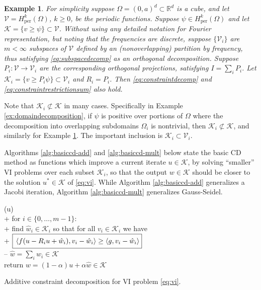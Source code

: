 \documentclass[letterpaper,final,12pt,reqno]{amsart}
\theoremstyle{cstyle}
\theoremstyle{cstyle*}
\theoremstyle{dstyle}
\newtheorem{example}[theorem]{Example}
\numberwithin{equation}{section}
\numberwithin{figure}{section}
\numberwithin{table}{section}
\numberwithin{theorem}{section}
\newcommand{\RR}{\mathbb{R}}
\newcommand{\cK}{\mathcal{K}}
\newcommand{\cV}{\mathcal{V}}
\newcommand{\ip}[2]{\left<#1,#2\right>}
\begin{document}
\begin{example}  \label{ex:frequencydecomposition}  For simplicity suppose $\Omega = (0,a)^d \subset \RR^d$ is a cube, and let $\cV = H_{\text{per}}^k(\Omega)$, $k\ge 0$, be the periodic functions.  Suppose $\psi \in H_{\text{per}}^k(\Omega)$ and let $\cK = \{v \ge \psi\} \subset \cV$.  Without using any detailed notation for Fourier representation, but noting that the frequencies are discrete, suppose $\{\cV_i\}$ are $m<\infty$ subspaces of $\cV$ defined by an (nonoverlapping) partition by frequency, thus satisfying \eqref{eq:subspacedecomp} as an orthogonal decomposition.  Suppose $P_i:\cV \to \cV_i$ are the corresponding orthogonal projections, satisfying $I = \sum_i P_i$.  Let $\cK_i = \{v \ge P_i \psi\} \subset \cV_i$ and $R_i = P_i$.  Then \eqref{eq:constraintdecomp} and \eqref{eq:constraintrestrictionsum} also hold.
\end{example}

Note that $\cK_i \not\subset \cK$ in many cases.  Specifically in Example \ref{ex:domaindecomposition}, if $\psi$ is positive over portions of $\Omega$ where the decomposition into overlapping subdomains $\Omega_i$ is nontrivial, then $\cK_i \not\subset \cK$, and similarly for Example \ref{ex:frequencydecomposition}.  The important inclusion is $\cK_i \subset \cV_i$.

Algorithms \ref{alg:basiccd-add} and \ref{alg:basiccd-mult} below state the basic CD method as functions which improve a current iterate $u \in \cK$, by solving ``smaller'' VI problems over each subset $\cK_i$, so that the output $w\in\cK$ should be closer to the solution $u^* \in \cK$ of \eqref{eq:vi}.  While Algorithm \ref{alg:basiccd-add} generalizes a Jacobi iteration, Algorithm \ref{alg:basiccd-mult} generalizes Gauss-Seidel.

\begin{pseudofloat}[H]
\begin{pseudo*}
(u\in\cK)\text{:} \\+
    for $i \in \{0,\dots,m-1\}$: \\+
        \rm{find} $\hat w_i\in \cK_i$ \rm{so that for all} $v_i\in \cK_i$ \rm{we have} \\+
            $\boxed{{\large \strut} \ip{f(u - R_i u + \hat w_i)}{v_i-\hat w_i} \ge \ip{g}{v_i-\hat w_i}}$ \\--
    $\hat w = \sum_i \hat w_i\in\cK$ \\
    return $w=(1-\alpha) u + \alpha \hat w\in\cK$
\end{pseudo*}
\caption{Additive constraint decomposition for VI problem \eqref{eq:vi}.}
\label{alg:basiccd-add}
\end{pseudofloat}
\end{document}
